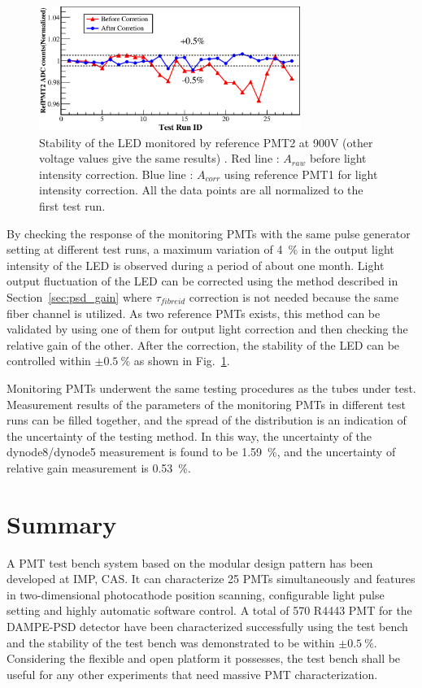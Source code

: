 \documentclass{nst}
\begin{document}
\begin{figure}[!htb]
	\centering
	\includegraphics[width=85mm]{FIG10}
	\caption{Stability of the LED monitored by reference PMT2 at 900V (other voltage values give the same results) . Red line : $A_{raw}$ before light intensity correction. Blue line : $A_{corr}$ using reference PMT1 for light intensity correction. All the data points are all normalized to the first test run.}
	\label{fig:FIG10}
\end{figure} 

By checking the response of the monitoring PMTs with the same pulse generator setting at different test runs, a maximum variation of \SI{4}{\percent} in the output light intensity of the LED is observed during a period of about one month.
Light output fluctuation of the LED can be corrected using the method described in Section~\ref{sec:psd_gain} where $\tau_{fibreid}$ correction is not needed because the same fiber channel is utilized.
As two reference PMTs exists, this method can be validated by using one of them for output light correction and then checking the relative gain of the other. 
After the correction, the stability of the LED can be controlled within $\pm\SI{0.5}{\percent}$ as shown in Fig.~\ref{fig:FIG10}.

Monitoring PMTs underwent the same testing procedures as the tubes under test.
Measurement results of the parameters of the monitoring PMTs in different test runs can be filled together, and the spread of the distribution is an indication of the uncertainty of the testing method.
In this way, the uncertainty of the dynode8/dynode5 measurement is found to be \SI{1.59}{\percent}, and the uncertainty of relative gain measurement is \SI{0.53}{\percent}. 
	
\section{Summary}
\label{sec:summary}
A PMT test bench system based on the modular design pattern has been developed at IMP, CAS.
It can characterize 25 PMTs simultaneously and features in two-dimensional photocathode position scanning, configurable light pulse setting and highly automatic software control. A total of 570 R4443 PMT for the DAMPE-PSD detector have been characterized successfully using the test bench and the stability of the test bench was demonstrated to be within $\pm\SI{0.5}{\percent}$.
Considering the flexible and open platform it possesses, the test bench shall be useful for any other experiments that need massive PMT characterization. 
\end{document}
